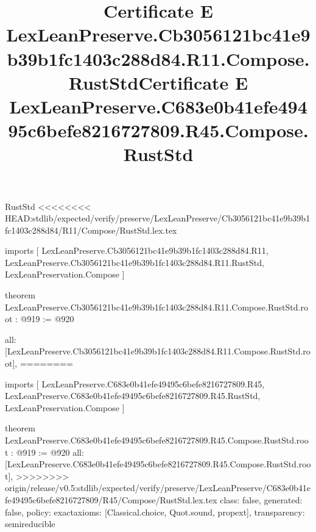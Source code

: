 \begin{lexlean}{RustStd}
<<<<<<<< HEAD:stdlib/expected/verify/preserve/LexLeanPreserve/Cb3056121bc41e9b39b1fc1403c288d84/R11/Compose/RustStd.lex.tex
\title{Certificate E LexLeanPreserve.Cb3056121bc41e9b39b1fc1403c288d84.R11.Compose.RustStd}
\begin{coremodule}
imports [
  LexLeanPreserve.Cb3056121bc41e9b39b1fc1403c288d84.R11,
  LexLeanPreserve.Cb3056121bc41e9b39b1fc1403c288d84.R11.RustStd,
  LexLeanPreservation.Compose
]

theorem LexLeanPreserve.Cb3056121bc41e9b39b1fc1403c288d84.R11.Compose.RustStd.root : @919 := @920 {
  all: [LexLeanPreserve.Cb3056121bc41e9b39b1fc1403c288d84.R11.Compose.RustStd.root],
========
\title{Certificate E LexLeanPreserve.C683e0b41efe49495c6befe8216727809.R45.Compose.RustStd}
\begin{coremodule}
imports [
  LexLeanPreserve.C683e0b41efe49495c6befe8216727809.R45,
  LexLeanPreserve.C683e0b41efe49495c6befe8216727809.R45.RustStd,
  LexLeanPreservation.Compose
]

theorem LexLeanPreserve.C683e0b41efe49495c6befe8216727809.R45.Compose.RustStd.root : @919 := @920 {
  all: [LexLeanPreserve.C683e0b41efe49495c6befe8216727809.R45.Compose.RustStd.root],
>>>>>>>> origin/release/v0.5:stdlib/expected/verify/preserve/LexLeanPreserve/C683e0b41efe49495c6befe8216727809/R45/Compose/RustStd.lex.tex
  class: false,
  generated: false,
  policy: exact{axioms: [Classical.choice, Quot.sound, propext]},
  transparency: semireducible
}


\end{coremodule}}
\end{coremodule}
\end{lexlean}

